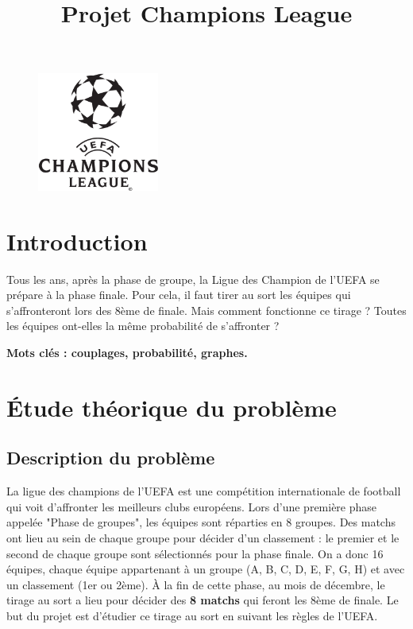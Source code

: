 \documentclass{../ficheTDTP}
\title{Projet Champions League}
\begin{document}
\maketitle

\begin{figure}[h]
\vspace{-5mm}
	\begin{center}
            \includegraphics[width=4cm]{championsleague.png}
        \end{center}
	
\end{figure}

\section*{Introduction}

Tous les ans, après la phase de groupe, la Ligue des Champion de l'UEFA se prépare à la phase finale. Pour cela, il faut tirer au sort les équipes qui s'affronteront lors des 8ème de finale. Mais comment fonctionne ce tirage ? Toutes les équipes ont-elles la même probabilité de s'affronter ?

\textbf{Mots clés : couplages, probabilité, graphes.}



\section{\'Etude théorique du problème}

\subsection{Description du problème}

La ligue des champions de l'UEFA est une compétition internationale de football qui voit d'affronter les meilleurs clubs européens. Lors d'une première phase appelée "Phase de groupes", les équipes sont réparties en 8 groupes. Des matchs ont lieu au sein de chaque groupe pour décider d'un classement : le premier et le second de chaque groupe sont sélectionnés pour la phase finale. On a donc 16 équipes, chaque équipe appartenant à un groupe (A, B, C, D, E, F, G, H) et avec un classement (1er ou 2ème). \`A la fin de cette phase, au mois de décembre, le tirage au sort a lieu pour décider des \textbf{8 matchs} qui feront les 8ème de finale. Le but du projet est d'étudier ce tirage au sort en suivant les règles de l'UEFA.
\end{document}
